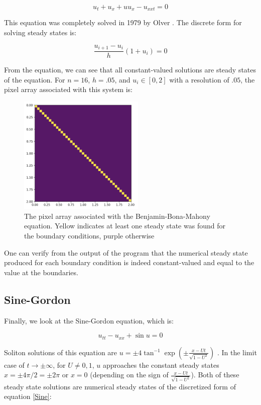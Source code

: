 \documentclass[11pt]{article}
\begin{document}
\begin{equation}
\label{bbm}
    u_t + u_x + uu_x - u_{xxt} = 0
\end{equation}

This equation was completely solved in 1979 by Olver \citep{olver_1979}. The discrete form for solving steady states is:

\begin{equation}
    \label{bbm_discrete}
    \frac{u_{i+1} - u_i}{h}(1 + u_i) = 0
\end{equation}

From the equation, we can see that all constant-valued solutions are steady states of the equation. For $n = 16$, $h = .05$, and $u_i \in [0,2]$ with a resolution of $.05$, the pixel array associated with this system is:

\begin{figure}[h]
\centering
\includegraphics[width=6cm]{images/bbm.png}
\caption{The pixel array associated with the Benjamin-Bona-Mahony equation. Yellow indicates at least one steady state was found for the boundary conditions, purple otherwise}
\label{bbmPixel}
\end{figure}

One can verify from the output of the program that the numerical steady state produced for each boundary condition is indeed constant-valued and equal to the value at the boundaries.

\subsection{Sine-Gordon}\label{sec:sg}

Finally, we look at the Sine-Gordon equation, which is:

\begin{equation}
    \label{Sine}
    u_{tt} - u_{xx} + \sin u = 0
\end{equation}

Soliton solutions of this equation are $u = \pm 4 \tan^{-1} \exp(\pm \frac{x - Ut}{\sqrt{1 - U^2}})$ \citep{SG-behavior}. In the limit case of $t \rightarrow \pm \infty$, for $U \neq 0,1$, $u$ approaches the constant steady states $x = \pm 4 \pi/2 = \pm 2\pi$ or $x = 0$ (depending on the sign of $\frac{x-Ut}{\sqrt{1-U^2}}$). Both of these steady state solutions are numerical steady states of the discretized form of equation \ref{Sine}:
\end{document}
